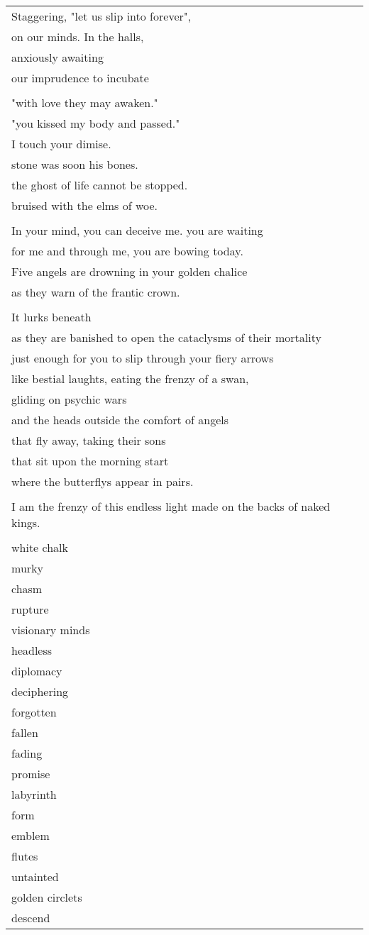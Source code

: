 \documentclass{article}
\begin{document}
\begin{center}
\begin{tabular}{l}
Staggering, "let us slip into forever", \\
on our minds. In the halls, \\
anxiously awaiting \\
our imprudence to incubate \\
\\
"with love they may awaken." \\
"you kissed my body and passed." \\
I touch your dimise. \\
stone was soon his bones. \\
the ghost of life cannot be stopped. \\
bruised with the elms of woe. \\
\\
In your mind, you can deceive me.  you are waiting \\
for me and through me, you are bowing today. \\
Five angels are drowning in your golden chalice \\
as they warn of the frantic crown. \\
\\
It lurks beneath \\
as they are banished to open the cataclysms of their mortality \\
just enough for you to slip through your fiery arrows \\
like bestial laughts, eating the frenzy of a swan, \\
gliding on psychic wars \\
and the heads outside the comfort of angels \\
that fly away, taking their sons \\
that sit upon the morning start \\
where the butterflys appear in pairs. \\
\\
I am the frenzy of this endless light made on the backs of naked kings. \\
\\
white chalk \\
murky \\
chasm \\
rupture \\
visionary minds \\
headless \\
diplomacy \\
deciphering \\
forgotten \\
fallen \\
fading \\
promise \\
labyrinth \\
form \\
emblem \\
flutes \\
untainted \\
golden circlets \\
descend 
\end{tabular}
\end{center}
\end{document}
